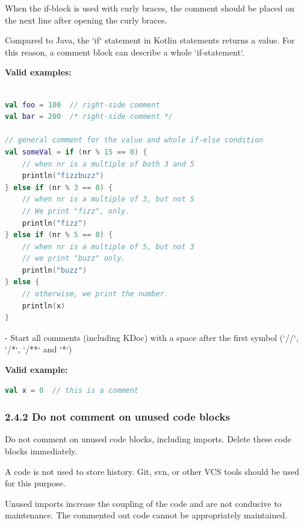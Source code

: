 When the if-block is used with curly braces, the comment should be placed on the next line after opening the curly braces.

Compared to Java, the `if` statement in Kotlin statements returns a value. For this reason, a comment block can describe a whole `if-statement`.



\textbf{Valid examples:}



\begin{lstlisting}[language=Kotlin]

val foo = 100  // right-side comment
val bar = 200  /* right-side comment */

// general comment for the value and whole if-else condition
val someVal = if (nr % 15 == 0) {
    // when nr is a multiple of both 3 and 5
    println("fizzbuzz")
} else if (nr % 3 == 0) {
    // when nr is a multiple of 3, but not 5
    // We print "fizz", only.
    println("fizz")
} else if (nr % 5 == 0) {
    // when nr is a multiple of 5, but not 3
    // we print "buzz" only.
    println("buzz")
} else {
    // otherwise, we print the number.
    println(x)
}
\end{lstlisting}


- Start all comments (including KDoc) with a space after the first symbol (`//`, `/*`, `/**` and `*`)



\textbf{Valid example:}



\begin{lstlisting}[language=Kotlin]
val x = 0  // this is a comment
\end{lstlisting}


\subsubsection*{\textbf{2.4.2 Do not comment on unused code blocks}}
\leavevmode\newline



Do not comment on unused code blocks, including imports. Delete these code blocks immediately.

A code is not used to store history. Git, svn, or other VCS tools should be used for this purpose.

Unused imports increase the coupling of the code and are not conducive to maintenance. The commented out code cannot be appropriately maintained.

